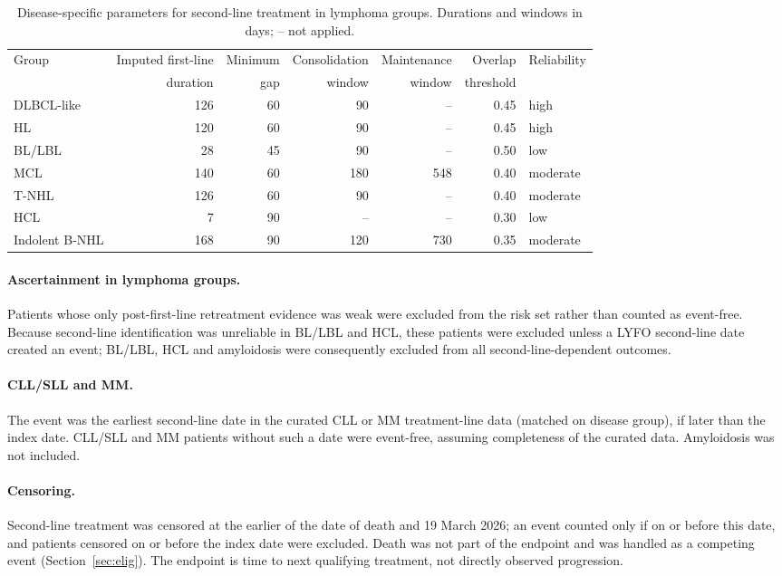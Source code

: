 \documentclass[10pt]{article}
\begin{document}
\begin{table}[ht]
\centering\footnotesize
\caption{Disease-specific parameters for second-line treatment in lymphoma groups.
Durations and windows in days; -- not applied.}\label{tab:2l}
\begin{tabular}{lrrrrrl}
\toprule
Group & Imputed first-line & Minimum & Consolidation & Maintenance & Overlap & Reliability\\
 & duration & gap & window & window & threshold & \\
\midrule
DLBCL-like & 126 & 60 & 90 & -- & 0.45 & high\\
HL & 120 & 60 & 90 & -- & 0.45 & high\\
BL/LBL & 28 & 45 & 90 & -- & 0.50 & low\\
MCL & 140 & 60 & 180 & 548 & 0.40 & moderate\\
T-NHL & 126 & 60 & 90 & -- & 0.40 & moderate\\
HCL & 7 & 90 & -- & -- & 0.30 & low\\
Indolent B-NHL & 168 & 90 & 120 & 730 & 0.35 & moderate\\
\bottomrule
\end{tabular}
\end{table}

\paragraph{Ascertainment in lymphoma groups.} Patients whose only
post-first-line retreatment evidence was weak were excluded from the risk set
rather than counted as event-free. Because second-line identification was
unreliable in BL/LBL and HCL, these patients were excluded unless a LYFO
second-line date created an event; BL/LBL, HCL and amyloidosis were
consequently excluded from all second-line-dependent outcomes.

\paragraph{CLL/SLL and MM.} The event was the earliest second-line date in
the curated CLL or MM treatment-line data (matched on disease group), if later
than the index date. CLL/SLL and MM patients without such a date were
event-free, assuming completeness of the curated data. Amyloidosis was not
included.

\paragraph{Censoring.} Second-line treatment was censored at the earlier of
the date of death and 19 March 2026; an event counted only if on or before
this date, and patients censored on or before the index date were excluded.
Death was not part of the endpoint and was handled as a competing event
(Section~\ref{sec:elig}). The endpoint is time to next qualifying treatment,
not directly observed progression.
\end{document}
